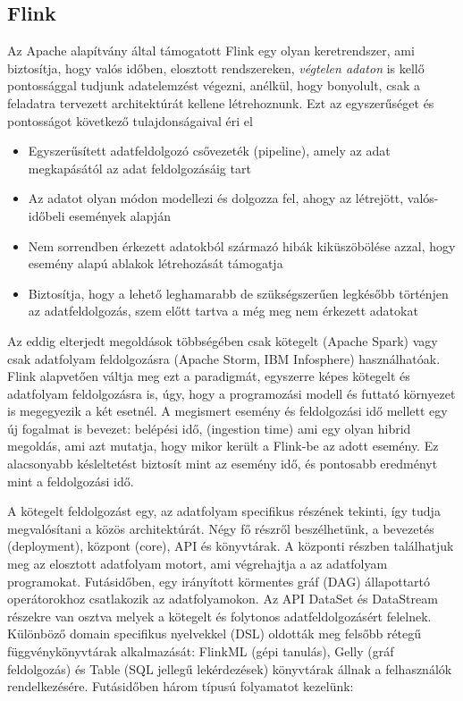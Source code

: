 \documentclass[a4paper,12pt]{article}
\begin{document}
\subsection{Flink}
Az Apache alapítvány által támogatott Flink egy olyan keretrendszer, ami biztosítja, hogy valós időben, elosztott rendszereken, \textsl{végtelen adaton} is kellő pontossággal tudjunk adatelemzést végezni, anélkül, hogy bonyolult, csak a feladatra tervezett architektúrát kellene létrehoznunk. Ezt az egyszerűséget és pontosságot következő tulajdonságaival éri el \cite{flinkartisans}
\begin{itemize}
\item Egyszerűsített adatfeldolgozó csővezeték (pipeline), amely az adat megkapásától az adat feldolgozásáig tart
\item Az adatot olyan módon modellezi és dolgozza fel, ahogy az létrejött, valós-időbeli események alapján
\item Nem sorrendben érkezett adatokból származó hibák kiküszöbölése azzal, hogy esemény alapú ablakok létrehozását támogatja
\item Biztosítja, hogy a lehető leghamarabb de szükségszerűen legkésőbb történjen az adatfeldolgozás, szem előtt tartva a még meg nem érkezett adatokat
\end{itemize}

Az eddig elterjedt megoldások többségében csak kötegelt (Apache Spark)\cite{spark} vagy csak adatfolyam feldolgozásra (Apache Storm\cite{storm}, IBM Infosphere\cite{infosphere}) használhatóak. Flink alapvetően váltja meg ezt a paradigmát, egyszerre képes kötegelt és adatfolyam feldolgozásra is, úgy, hogy a programozási modell és futtató környezet is megegyezik a két esetnél. A megismert esemény és feldolgozási idő mellett egy új fogalmat is bevezet: belépési idő, (ingestion time)\cite{ingestion} ami egy olyan hibrid megoldás, ami azt mutatja, hogy mikor került a Flink-be az adott esemény.
Ez alacsonyabb késleltetést biztosít mint az esemény idő, és pontosabb eredményt mint a feldolgozási idő. \newline

A kötegelt feldolgozást egy, az adatfolyam specifikus részének tekinti, így tudja megvalósítani a közös architektúrát. Négy fő részről beszélhetünk, a bevezetés (deployment), központ (core), API és könyvtárak. A központi részben találhatjuk meg az elosztott adatfolyam motort, ami végrehajtja a az adatfolyam programokat. Futásidőben, egy irányított körmentes gráf (DAG) állapottartó operátorokhoz csatlakozik az adatfolyamokon. Az API DataSet és DataStream részekre van osztva melyek a kötegelt és folytonos adatfeldolgozásért felelnek. Különböző domain specifikus nyelvekkel (DSL) oldották meg felsőbb rétegű függvénykönyvtárak alkalmazását: FlinkML (gépi tanulás), Gelly (gráf feldolgozás) és Table (SQL jellegű lekérdezések) könyvtárak állnak a felhasználók rendelkezésére.  Futásidőben három típusú folyamatot kezelünk:
 
\end{document}
